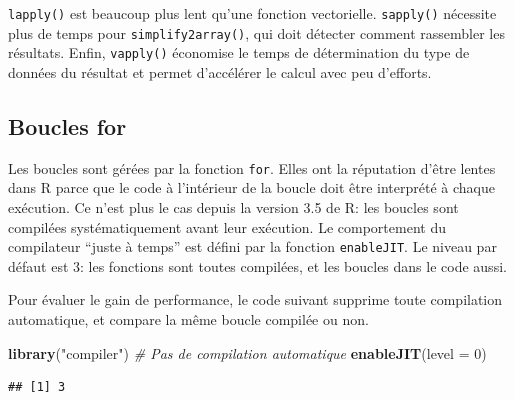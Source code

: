 \documentclass[
  12pt,
  french,
  a4paper,
  extrafontsizes,onecolumn,openright
  ]{memoir}
\newenvironment{Shaded}{\begin{snugshade}}{\end{snugshade}}
\newcommand{\CommentTok}[1]{\textcolor[rgb]{0.56,0.35,0.01}{\textit{#1}}}
\newcommand{\DataTypeTok}[1]{\textcolor[rgb]{0.13,0.29,0.53}{#1}}
\newcommand{\DecValTok}[1]{\textcolor[rgb]{0.00,0.00,0.81}{#1}}
\newcommand{\KeywordTok}[1]{\textcolor[rgb]{0.13,0.29,0.53}{\textbf{#1}}}
\newcommand{\NormalTok}[1]{#1}
\newcommand{\StringTok}[1]{\textcolor[rgb]{0.31,0.60,0.02}{#1}}
\newlength{\rf}
\begin{document}
\normalsize
\texttt{lapply()} est beaucoup plus lent qu'une fonction vectorielle.
\texttt{sapply()} nécessite plus de temps pour \texttt{simplify2array()}, qui doit détecter comment rassembler les résultats.
Enfin, \texttt{vapply()} économise le temps de détermination du type de données du résultat et permet d'accélérer le calcul avec peu d'efforts.

\hypertarget{boucles-for}{%
\subsection{Boucles for}\label{boucles-for}}

Les boucles sont gérées par la fonction \texttt{for}.
Elles ont la réputation d'être lentes dans R parce que le code à l'intérieur de la boucle doit être interprété à chaque exécution.
Ce n'est plus le cas depuis la version 3.5 de R: les boucles sont compilées systématiquement avant leur exécution.
Le comportement du compilateur \enquote{juste à temps} est défini par la fonction \texttt{enableJIT}.
Le niveau par défaut est 3: les fonctions sont toutes compilées, et les boucles dans le code aussi.

Pour évaluer le gain de performance, le code suivant supprime toute compilation automatique, et compare la même boucle compilée ou non.

\scriptsize

\begin{Shaded}
\begin{Highlighting}[]
\KeywordTok{library}\NormalTok{(}\StringTok{"compiler"}\NormalTok{)}
\CommentTok{# Pas de compilation automatique}
\KeywordTok{enableJIT}\NormalTok{(}\DataTypeTok{level =} \DecValTok{0}\NormalTok{)}
\end{Highlighting}
\end{Shaded}

\begin{verbatim}
## [1] 3
\end{verbatim}
\end{document}
